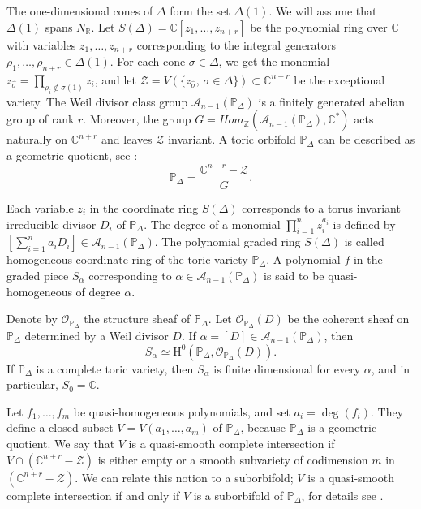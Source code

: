 \documentclass[11pt]{amsart}
\theoremstyle{plain}
\theoremstyle{definition}
\begin{document}
The one-dimensional cones of $\Delta$ form the set $\Delta(1)$. We will assume that $\Delta(1)$ spans $N_{\mathbb{R}}$.
Let $S(\Delta)=\mathbb{C}\left[z_1,\ldots,z_{n+r}\right]$ be the polynomial ring over $\mathbb{C}$ with variables $z_1,\ldots,z_{n+r}$
corresponding to the integral generators $\rho_1,\ldots,\rho_{n+r}\in\Delta(1)$.
For each cone $\sigma \in \Delta$, we get the monomial $z_{\hat{\sigma}}=\prod_{\rho_i\notin \sigma(1)}z_i$, and let
$\mathcal{Z}=V(\{z_{\hat{\sigma}},\,\sigma \in \Delta\})\subset \mathbb{C}^{n+r}$ be the exceptional variety.
The Weil divisor class group $\mathcal{A}_{n-1}(\mathbb{P}_{\Delta})$ is a finitely generated 
abelian group of rank $r$.
Moreover, the group $G=Hom_{\mathbb{Z}}(\mathcal{A}_{n-1}(\mathbb{P}_{\Delta}), \mathbb{C}^*)$ 
acts naturally on $\mathbb{C}^{n+r}$ and leaves $\mathcal{Z}$ invariant.
A toric orbifold $\mathbb{P}_{\Delta}$ can be described as a geometric quotient, see \cite{Cox}:
$$\mathbb{P}_{\Delta}=\frac{\mathbb{C}^{n+r}-\mathcal{Z}}{G}.$$

Each variable $z_i$ in the coordinate ring $S(\Delta)$ corresponds to a torus invariant
irreducible divisor $D_i$ of $\mathbb{P}_{\Delta}$.
The degree of a monomial $\prod_{i=1}^n z_i^{a_i}$ is defined by
$\left[\sum_{i=1}^na_iD_i\right]\in \mathcal{A}_{n-1}(\mathbb{P}_{\Delta})$. 
The polynomial graded ring $S(\Delta)$ is called homogeneous coordinate ring of the toric variety $\mathbb{P}_{\Delta}$.
A polynomial $f$ in the graded piece $S_{\alpha}$ corresponding to $\alpha\in\mathcal{A}_{n-1}(\mathbb{P}_{\Delta})$ is said
to be quasi-homogeneous of degree $\alpha$.

Denote by $\mathcal{O}_{\mathbb{P}_{\Delta}}$ the structure sheaf of $\mathbb{P}_{\Delta}$. Let $\mathcal{O}_{\mathbb{P}_{\Delta}}(D)$ be the coherent sheaf on $\mathbb{P}_{\Delta}$ determined by a Weil divisor $D$. If $\alpha = [D] \in \mathcal{A}_{n-1}(\mathbb{P}_{\Delta})$, then
$$S_{\alpha}\simeq \mathrm{H}^0(\mathbb{P}_{\Delta},\mathcal{O}_{\mathbb{P}_{\Delta}}(D)).$$
If $\mathbb{P}_{\Delta}$ is a complete toric variety, then $S_{\alpha}$ is finite dimensional for every $\alpha$, 
and in particular, $S_0 = \mathbb{C}$.

Let $f_1,\ldots,f_m$ be quasi-homogeneous polynomials, and set $a_i=\deg(f_i)$. They define a closed subset 
$V=V(a_1,\ldots,a_m)$ of $\mathbb{P}_{\Delta}$, because $\mathbb{P}_{\Delta}$ is a geometric quotient.
We say that $V$ is a quasi-smooth complete intersection if $V\cap(\mathbb{C}^{n+r}-\mathcal{Z})$ 
is either empty or a smooth subvariety of codimension $m$ in $(\mathbb{C}^{n+r}-\mathcal{Z})$.
We can relate this notion to a suborbifold; $V$ is a quasi-smooth complete intersection
if and only if $V$ is a suborbifold of $\mathbb{P}_{\Delta}$, for details see \cite{Cox1, Ma}.
\end{document}
